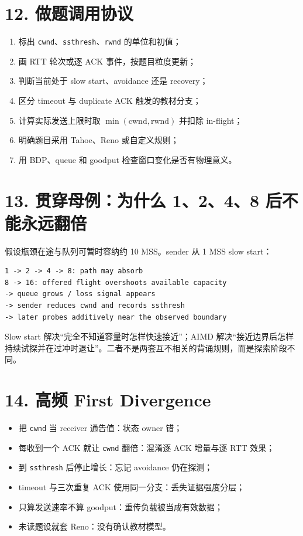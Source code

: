 \documentclass[UTF8,fontset=none,11pt,a4paper]{ctexart}
\providecommand{\tightlist}{\setlength{\itemsep}{0pt}\setlength{\parskip}{0pt}}
\providecommand{\passthrough}[1]{#1}
\begin{document}
\section{12.
做题调用协议}\label{12-ux505aux9898ux8c03ux7528ux534fux8bae}

\begin{enumerate}
\def\labelenumi{\arabic{enumi}.}
\tightlist
\item
  标出
  \passthrough{\lstinline!cwnd!}、\passthrough{\lstinline!ssthresh!}、\passthrough{\lstinline!rwnd!}
  的单位和初值；
\item
  画 RTT 轮次或逐 ACK 事件，按题目粒度更新；
\item
  判断当前处于 slow start、avoidance 还是 recovery；
\item
  区分 timeout 与 duplicate ACK 触发的教材分支；
\item
  计算实际发送上限时取 \(\min(\text{cwnd}, \text{rwnd})\) 并扣除
  in-flight；
\item
  明确题目采用 Tahoe、Reno 或自定义规则；
\item
  用 BDP、queue 和 goodput 检查窗口变化是否有物理意义。
\end{enumerate}

\section{13. 贯穿母例：为什么 1、2、4、8
后不能永远翻倍}\label{13-ux8d2fux7a7fux6bcdux4f8bux4e3aux4ec0ux4e48-1248-ux540eux4e0dux80fdux6c38ux8fdcux7ffbux500d}

假设瓶颈在途与队列可暂时容纳约 10 MSS。sender 从 1 MSS slow start：

\begin{lstlisting}
1 -> 2 -> 4 -> 8: path may absorb
8 -> 16: offered flight overshoots available capacity
-> queue grows / loss signal appears
-> sender reduces cwnd and records ssthresh
-> later probes additively near the observed boundary
\end{lstlisting}

Slow start 解决``完全不知道容量时怎样快速接近''；AIMD
解决``接近边界后怎样持续试探并在过冲时退让''。二者不是两套互不相关的背诵规则，而是探索阶段不同。

\section{14. 高频 First
Divergence}\label{14-ux9ad8ux9891-first-divergence}

\begin{itemize}
\tightlist
\item
  把 \passthrough{\lstinline!cwnd!} 当 receiver 通告值：状态 owner 错；
\item
  每收到一个 ACK 就让 \passthrough{\lstinline!cwnd!} 翻倍：混淆逐 ACK
  增量与逐 RTT 效果；
\item
  到 \passthrough{\lstinline!ssthresh!} 后停止增长：忘记 avoidance
  仍在探测；
\item
  timeout 与三次重复 ACK 使用同一分支：丢失证据强度分层；
\item
  只算发送速率不算 goodput：重传负载被当成有效数据；
\item
  未读题设就套 Reno：没有确认教材模型。
\end{itemize}
\end{document}
